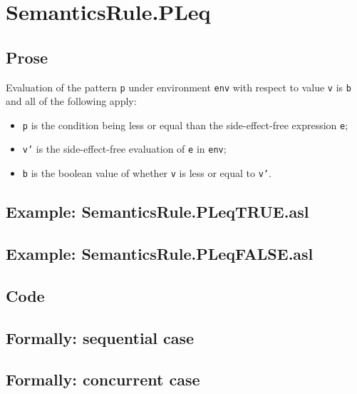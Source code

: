 \documentclass{book}
\begin{document}

\section{SemanticsRule.PLeq \label{sec:SemanticsRule.PLeq}}

    \subsection{Prose}
    Evaluation of the pattern \texttt{p} under environment \texttt{env} with
    respect to value \texttt{v} is \texttt{b} and all of the following apply:
    \begin{itemize}
      \item \texttt{p} is the condition being less or equal than the side-effect-free expression \texttt{e};
      \item \texttt{v'} is the side-effect-free evaluation of \texttt{e} in \texttt{env};
      \item \texttt{b} is the boolean value of whether \texttt{v} is less or equal to \texttt{v'}.
    \end{itemize}

    \subsection{Example: SemanticsRule.PLeqTRUE.asl}

    \subsection{Example: SemanticsRule.PLeqFALSE.asl}

  \subsection{Code}

\begin{emptyformal}
  \subsection{Formally: sequential case}

  \subsection{Formally: concurrent case}
\end{emptyformal}
\end{document}
